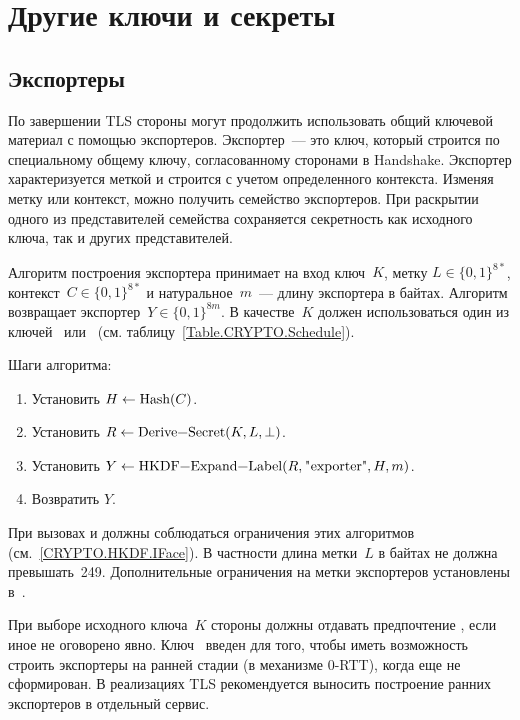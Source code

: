 \section{Другие ключи и секреты}\label{CRYPTO.Other}

\subsection{Экспортеры}\label{CRYPTO.Exp}

По завершении TLS стороны могут продолжить использовать общий ключевой материал 
с помощью экспортеров. Экспортер~--- это ключ, который строится по специальному 
общему ключу, согласованному сторонами в Handshake. Экспортер характеризуется 
меткой и строится с учетом определенного контекста. Изменяя метку или контекст, 
можно получить семейство экспортеров. При раскрытии одного из представителей 
семейства сохраняется секретность как исходного ключа, так и других 
представителей.

Алгоритм построения экспортера принимает на вход ключ~$K$, метку 
$L\in\{0,1\}^{8*}$, контекст~$C\in\{0,1\}^{8*}$ и натуральное~$m$~---
длину экспортера в байтах. Алгоритм возвращает экспортер~$Y\in\{0,1\}^{8m}$. 
%
В качестве~$K$ должен использоваться один из
ключей~ или~
(см. таблицу~\ref{Table.CRYPTO.Schedule}). 

Шаги алгоритма:
\begin{enumerate}
\item
Установить $H\gets\code{Hash}(C)$.
\item
Установить $R\gets\code{Derive-Secret}(K,L,\perp)$.
\item
Установить $Y\gets\code{HKDF-Expand-Label}(R,\str{exporter}, H, m)$.
\item
Возвратить $Y$.
\end{enumerate}

При вызовах  и  должны соблюдаться 
ограничения этих алгоритмов (см.~\ref{CRYPTO.HKDF.IFace}). В частности длина 
метки~$L$ в байтах не должна превышать~249. Дополнительные ограничения на  
метки экспортеров установлены в~\cite{RFC5705}.

При выборе исходного ключа~$K$ стороны должны отдавать предпочтение 
, если иное не оговорено явно.
%
Ключ~ введен для того, чтобы иметь 
возможность строить экспортеры на ранней стадии (в механизме 0-RTT), 
когда  еще не сформирован.
%
В реализациях TLS рекомендуется выносить построение ранних экспортеров
в отдельный сервис.

